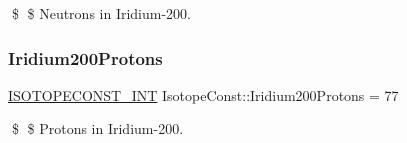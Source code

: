 \$ \$ Neutrons in Iridium-\/200. \mbox{\label{group___isotope_const-_iridium-_ir200_ga35e519e4aefce8e71cca253f3573f8f6}} 
\subsubsection{\texorpdfstring{Iridium200\+Protons}{Iridium200Protons}}
{\footnotesize\ttfamily \mbox{\hyperlink{group___isotope_const-_macros_ga5f18360b3e99483a35c32d789e62621c}{I\+S\+O\+T\+O\+P\+E\+C\+O\+N\+S\+T\+\_\+\+I\+NT}} Isotope\+Const\+::\+Iridium200\+Protons = 77}

\$ \$ Protons in Iridium-\/200. 